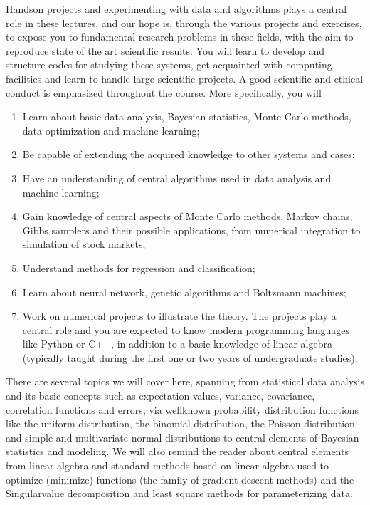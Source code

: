 \documentclass[letterpaper,10pt,english]{sphinxmanual}
\begin{document}
Hands\sphinxhyphen{}on projects and experimenting with data and algorithms plays a central role in
these lectures, and our hope is, through the various
projects and exercises, to  expose you to fundamental
research problems in these fields, with the aim to reproduce state of
the art scientific results. You  will learn to develop and
structure codes for studying these systems, get acquainted with
computing facilities and learn to handle large scientific projects. A
good scientific and ethical conduct is emphasized throughout the
course. More specifically, you will
\begin{enumerate}
%
\item {} 
Learn about basic data analysis, Bayesian statistics, Monte Carlo methods, data optimization and machine learning;

\item {} 
Be capable of extending the acquired knowledge to other systems and cases;

\item {} 
Have an understanding of central algorithms used in data analysis and machine learning;

\item {} 
Gain knowledge of central aspects of Monte Carlo methods, Markov chains, Gibbs samplers and their possible applications, from numerical integration to simulation of stock markets;

\item {} 
Understand methods for regression and classification;

\item {} 
Learn about neural network, genetic algorithms and Boltzmann machines;

\item {} 
Work on numerical projects to illustrate the theory. The projects play a central role and you are expected to know modern programming languages like Python or C++, in addition to a basic knowledge of linear algebra (typically taught during the first one or two years of undergraduate studies).

\end{enumerate}

There are several topics we will cover here, spanning from
statistical data analysis and its basic concepts such as expectation
values, variance, covariance, correlation functions and errors, via
well\sphinxhyphen{}known probability distribution functions like the uniform
distribution, the binomial distribution, the Poisson distribution and
simple and multivariate normal distributions to central elements of
Bayesian statistics and modeling. We will also remind the reader about
central elements from linear algebra and standard methods based on
linear algebra used to optimize (minimize) functions (the family of gradient descent methods)
and the Singular\sphinxhyphen{}value decomposition and
least square methods for parameterizing data.
\end{document}
